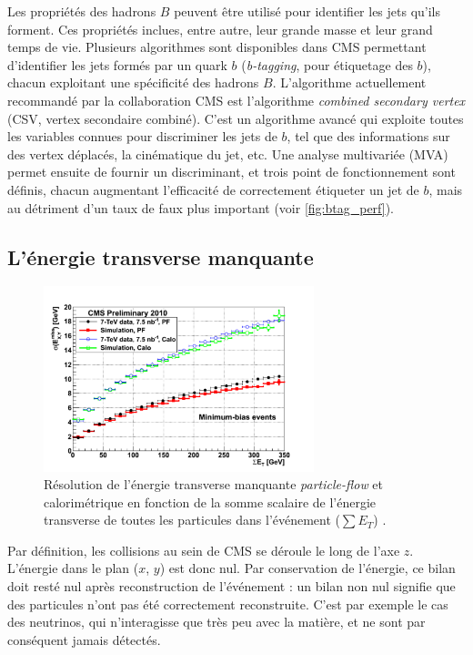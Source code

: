 Les propriétés des hadrons $B$ peuvent être utilisé pour identifier les jets qu'ils forment. Ces propriétés inclues, entre autre, leur grande masse et leur grand temps de vie. Plusieurs algorithmes sont disponibles dans CMS permettant d'identifier les jets formés par un quark $b$ (\emph{b-tagging}, pour étiquetage des $b$), chacun exploitant une spécificité des hadrons $B$. L'algorithme actuellement recommandé par la collaboration CMS est l'algorithme \emph{combined secondary vertex} (CSV, vertex secondaire combiné). C'est un algorithme avancé qui exploite toutes les variables connues pour discriminer les jets de $b$, tel que des informations sur des vertex déplacés, la cinématique du jet, etc. Une analyse multivariée (MVA) permet ensuite de fournir un discriminant, et trois point de fonctionnement sont définis, chacun augmentant l'efficacité de correctement étiqueter un jet de $b$, mais au détriment d'un taux de faux plus important (voir \cref{fig:btag_perf}).

\subsection{L'énergie transverse manquante}

\begin{figure}[tbp]
    \centering
    \includegraphics[width=0.7\textwidth]{chapitre3/figs/pf_met_resolution.png}
    \caption{Résolution de l'énergie transverse manquante \emph{particle-flow} et calorimétrique en fonction de la somme scalaire de l'énergie transverse de toutes les particules dans l'événement ($\sum E_T$) \citep{cms_pf_jets}.}
    \label{fig:met_resolution}
\end{figure}

Par définition, les collisions au sein de CMS se déroule le long de l'axe $z$. L'énergie dans le plan ($x$, $y$) est donc nul. Par conservation de l'énergie, ce bilan doit resté nul après reconstruction de l'événement : un bilan non nul signifie que des particules n'ont pas été correctement reconstruite. C'est par exemple le cas des neutrinos, qui n'interagisse que très peu avec la matière, et ne sont par conséquent jamais détectés.

